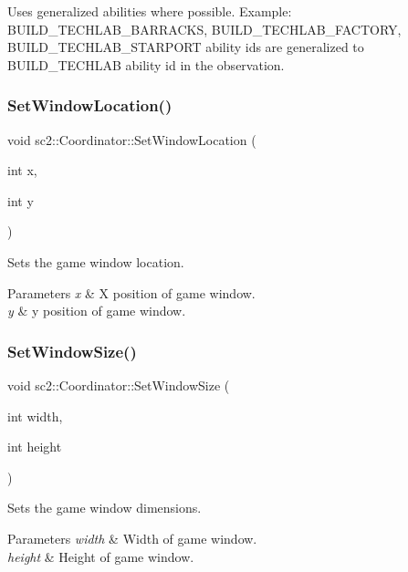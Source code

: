 Uses generalized abilities where possible. Example\+: B\+U\+I\+L\+D\+\_\+\+T\+E\+C\+H\+L\+A\+B\+\_\+\+B\+A\+R\+R\+A\+C\+KS, B\+U\+I\+L\+D\+\_\+\+T\+E\+C\+H\+L\+A\+B\+\_\+\+F\+A\+C\+T\+O\+RY, B\+U\+I\+L\+D\+\_\+\+T\+E\+C\+H\+L\+A\+B\+\_\+\+S\+T\+A\+R\+P\+O\+RT ability ids are generalized to B\+U\+I\+L\+D\+\_\+\+T\+E\+C\+H\+L\+AB ability id in the observation. \mbox{\label{classsc2_1_1_coordinator_a6e372788e11c3916fdf1982eb2e55511}} 
\subsubsection{\texorpdfstring{Set\+Window\+Location()}{SetWindowLocation()}}
{\footnotesize\ttfamily void sc2\+::\+Coordinator\+::\+Set\+Window\+Location (\begin{DoxyParamCaption}\item[{int}]{x,  }\item[{int}]{y }\end{DoxyParamCaption})}

Sets the game window location. 
\begin{DoxyParams}{Parameters}
{\em x} & X position of game window. \\
\hline
{\em y} & y position of game window. \\
\hline
\end{DoxyParams}
\mbox{\label{classsc2_1_1_coordinator_a9b0eca71a6f7575f35d1dd5c3e5d73cf}} 
\subsubsection{\texorpdfstring{Set\+Window\+Size()}{SetWindowSize()}}
{\footnotesize\ttfamily void sc2\+::\+Coordinator\+::\+Set\+Window\+Size (\begin{DoxyParamCaption}\item[{int}]{width,  }\item[{int}]{height }\end{DoxyParamCaption})}

Sets the game window dimensions. 
\begin{DoxyParams}{Parameters}
{\em width} & Width of game window. \\
\hline
{\em height} & Height of game window. \\
\hline
\end{DoxyParams}
\mbox{\label{classsc2_1_1_coordinator_a32ea6e639a39ec1fc813dffa2993d5b1}} 
